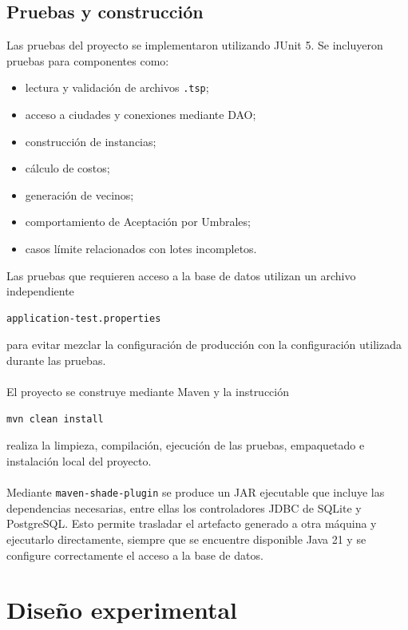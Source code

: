 \documentclass[12pt]{article}
\begin{document}
\subsection{Pruebas y construcción}

Las pruebas del proyecto se implementaron utilizando JUnit 5. Se incluyeron
pruebas para componentes como:
\begin{itemize}
    \item lectura y validación de archivos \texttt{.tsp};
    \item acceso a ciudades y conexiones mediante DAO;
    \item construcción de instancias;
    \item cálculo de costos;
    \item generación de vecinos;
    \item comportamiento de Aceptación por Umbrales;
    \item casos límite relacionados con lotes incompletos.
\end{itemize}
Las pruebas que requieren acceso a la base de datos utilizan un archivo
independiente
\begin{verbatim}
application-test.properties
\end{verbatim}
para evitar mezclar la configuración de producción con la configuración
utilizada durante las pruebas.
\\\\
El proyecto se construye mediante Maven y la instrucción
\begin{verbatim}
mvn clean install
\end{verbatim}
realiza la limpieza, compilación, ejecución de las pruebas, empaquetado e
instalación local del proyecto.
\\\\
Mediante \texttt{maven-shade-plugin} se produce un JAR ejecutable que
incluye las dependencias necesarias, entre ellas los controladores JDBC de
SQLite y PostgreSQL. Esto permite trasladar el artefacto generado a otra
máquina y ejecutarlo directamente, siempre que se encuentre disponible Java
21 y se configure correctamente el acceso a la base de datos.

\section{Diseño experimental}
\label{sec:diseno-experimental}
\end{document}
